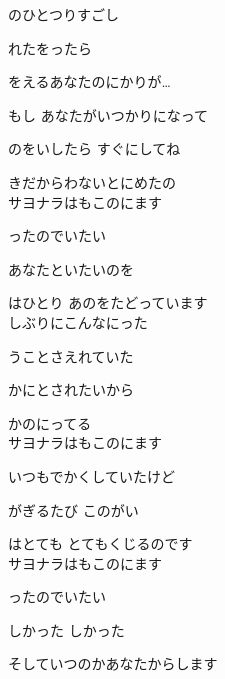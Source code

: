 \large{

のひとつりすごし

れたをったら

をえるあなたのにかりが…

もし あなたがいつかりになって

のをいしたら すぐにしてね

きだからわないとにめたの
\\

サヨナラはもこのにます

ったのでいたい

あなたといたいのを

はひとり あのをたどっています
\\

しぶりにこんなにった

うことさえれていた

かにとされたいから

かのにってる
\\

サヨナラはもこのにます

いつもでかくしていたけど

がぎるたび このがい

はとても とてもくじるのです
\\

サヨナラはもこのにます

ったのでいたい

しかった しかった

そしていつのかあなたからします

}